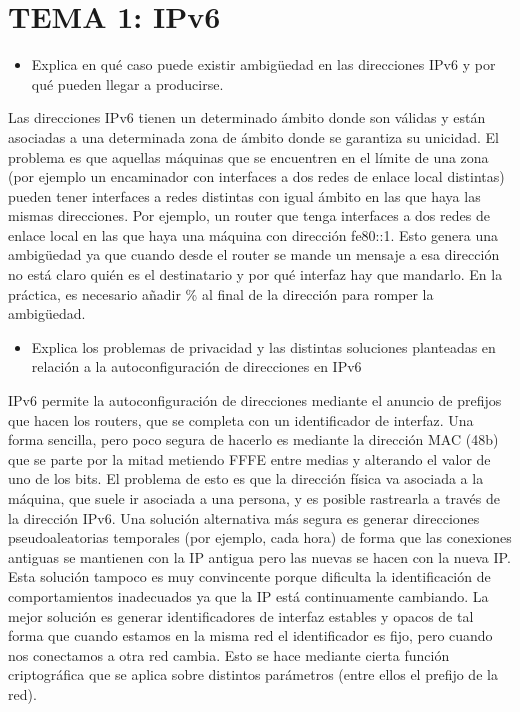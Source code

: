 \documentclass[]{article}
\date{}
\providecommand{\tightlist}{%
  \setlength{\itemsep}{0pt}\setlength{\parskip}{0pt}}
\begin{document}
\hypertarget{tema-1-ipv6}{%
\section{TEMA 1: IPv6}\label{tema-1-ipv6}}

\begin{itemize}
\tightlist
\item
  Explica en qué caso puede existir ambigüedad en las direcciones IPv6 y
  por qué pueden llegar a producirse.
\end{itemize}

Las direcciones IPv6 tienen un determinado ámbito donde son válidas y
están asociadas a una determinada zona de ámbito donde se garantiza su
unicidad. El problema es que aquellas máquinas que se encuentren en el
límite de una zona (por ejemplo un encaminador con interfaces a dos
redes de enlace local distintas) pueden tener interfaces a redes
distintas con igual ámbito en las que haya las mismas direcciones. Por
ejemplo, un router que tenga interfaces a dos redes de enlace local en
las que haya una máquina con dirección fe80::1. Esto genera una
ambigüedad ya que cuando desde el router se mande un mensaje a esa
dirección no está claro quién es el destinatario y por qué interfaz hay
que mandarlo. En la práctica, es necesario añadir \% al final de la
dirección para romper la ambigüedad.

\begin{itemize}
\tightlist
\item
  Explica los problemas de privacidad y las distintas soluciones
  planteadas en relación a la autoconfiguración de direcciones en IPv6
\end{itemize}

IPv6 permite la autoconfiguración de direcciones mediante el anuncio de
prefijos que hacen los routers, que se completa con un identificador de
interfaz. Una forma sencilla, pero poco segura de hacerlo es mediante la
dirección MAC (48b) que se parte por la mitad metiendo FFFE entre medias
y alterando el valor de uno de los bits. El problema de esto es que la
dirección física va asociada a la máquina, que suele ir asociada a una
persona, y es posible rastrearla a través de la dirección IPv6. Una
solución alternativa más segura es generar direcciones pseudoaleatorias
temporales (por ejemplo, cada hora) de forma que las conexiones antiguas
se mantienen con la IP antigua pero las nuevas se hacen con la nueva IP.
Esta solución tampoco es muy convincente porque dificulta la
identificación de comportamientos inadecuados ya que la IP está
continuamente cambiando. La mejor solución es generar identificadores de
interfaz estables y opacos de tal forma que cuando estamos en la misma
red el identificador es fijo, pero cuando nos conectamos a otra red
cambia. Esto se hace mediante cierta función criptográfica que se aplica
sobre distintos parámetros (entre ellos el prefijo de la red).
\end{document}
